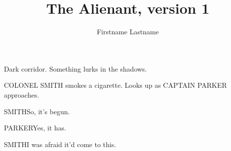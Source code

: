\documentclass{screenplay}
\title{The Alienant, version 1}
\author{Firstname Lastname}
\begin{document}
\coverpage
\fadein

Dark corridor. Something lurks in the shadows.

COLONEL SMITH smokes a cigarette. Looks up as CAPTAIN PARKER approaches.
\begin{dialogue}{SMITH}So, it's begun.\end{dialogue}
\begin{dialogue}{PARKER}Yes, it has.\end{dialogue}
\begin{dialogue}{SMITH}I was afraid it'd come to this.\end{dialogue}

\theend
\end{document}
